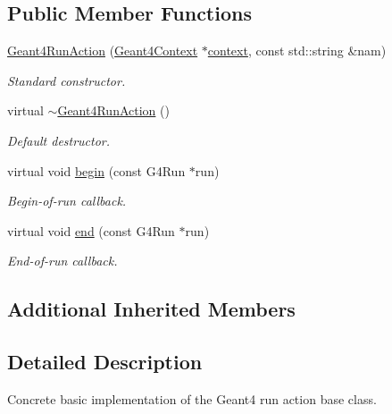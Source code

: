 \subsection*{Public Member Functions}
\begin{DoxyCompactItemize}
\item 
\hyperlink{class_d_d4hep_1_1_simulation_1_1_geant4_run_action_a844999c8060118d8052d5fa3964f2e68}{Geant4\+Run\+Action} (\hyperlink{class_d_d4hep_1_1_simulation_1_1_geant4_context}{Geant4\+Context} $\ast$\hyperlink{class_d_d4hep_1_1_simulation_1_1_geant4_action_aa9d87f0ec2a72b7fc2591b18f98d75cf}{context}, const std\+::string \&nam)
\begin{DoxyCompactList}\small\item\em Standard constructor. \end{DoxyCompactList}\item 
virtual \hyperlink{class_d_d4hep_1_1_simulation_1_1_geant4_run_action_ac4db0a811956b595cfba64e2a210e290}{$\sim$\+Geant4\+Run\+Action} ()
\begin{DoxyCompactList}\small\item\em Default destructor. \end{DoxyCompactList}\item 
virtual void \hyperlink{class_d_d4hep_1_1_simulation_1_1_geant4_run_action_aeea4684e5d27e039b26734c3dbf3f65b}{begin} (const G4\+Run $\ast$run)
\begin{DoxyCompactList}\small\item\em Begin-\/of-\/run callback. \end{DoxyCompactList}\item 
virtual void \hyperlink{class_d_d4hep_1_1_simulation_1_1_geant4_run_action_a71c7dbfb3451a9d6cc594f0174a631a2}{end} (const G4\+Run $\ast$run)
\begin{DoxyCompactList}\small\item\em End-\/of-\/run callback. \end{DoxyCompactList}\end{DoxyCompactItemize}
\subsection*{Additional Inherited Members}


\subsection{Detailed Description}
Concrete basic implementation of the Geant4 run action base class. 

